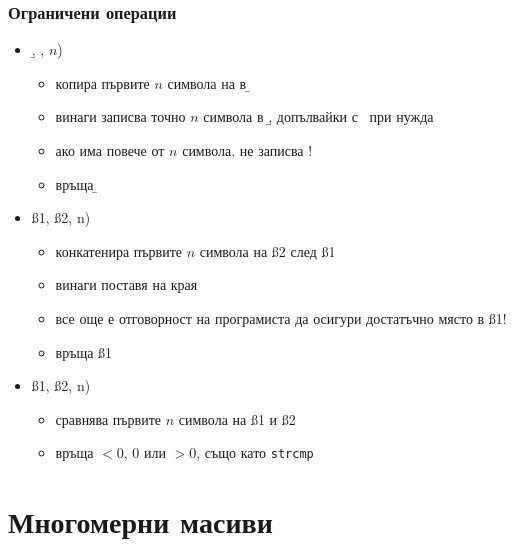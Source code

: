 \documentclass{beamer}
\begin{document}
\begin{frame}
  \frametitle{Ограничени операции}

  \begin{itemize}[<+->]
  \item {}\b, \s, $n$\tta)
    \begin{itemize}
    \item копира първите $n$ символа на \s в \b
    \item винаги записва точно $n$ символа в \b, допълвайки с \term\ при нужда
    \item \alert{ако \s има повече от $n$ символа, не записва \term!}
    \item връща \b
    \end{itemize}
  \item {}\ss1, \ss2, n\tta)
    \begin{itemize}
    \item конкатенира първите $n$ символа на \ss2 след \ss1
    \item винаги поставя \term на края
    \item \alert{все още е отговорност на програмиста да осигури достатъчно място в \ss1!}
    \item връща \ss1
    \end{itemize}
  \item {}\ss1, \ss2, n\tta)
    \begin{itemize}
    \item сравнява първите $n$ символа на \ss1 и \ss2
    \item връща $<0$, $0$ или $>0$, също като \tt{strcmp}
    \end{itemize}
  \end{itemize}
\end{frame}

\section{Многомерни масиви}
\end{document}
